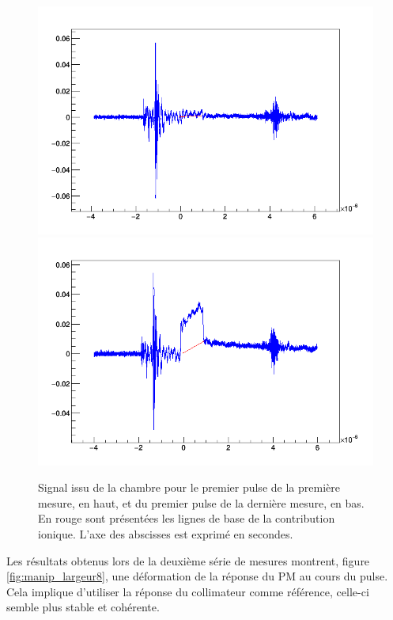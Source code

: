 \documentclass[a4paper,11pt]{article}
\begin{document}
\begin{figure}[h]
\begin{center}
\includegraphics[width=\linewidth]{manip1_1_chambre.png} 
\includegraphics[width=\linewidth]{manip12_2_chambre.png} 
\caption{\label{fig:manip1_2}\footnotesize{Signal issu de la chambre pour le premier pulse de la première mesure, en haut, et du premier pulse de la dernière mesure, en bas. En rouge sont présentées les lignes de base de la contribution ionique. L'axe des abscisses est exprimé en secondes.}}
\end{center}
\end{figure}

Les résultats obtenus lors de la deuxième série de mesures montrent, figure \ref{fig:manip_largeur8}, une déformation de la réponse du PM au cours du pulse.
Cela implique d'utiliser la réponse du collimateur comme référence, celle-ci semble plus stable et cohérente.
\end{document}
